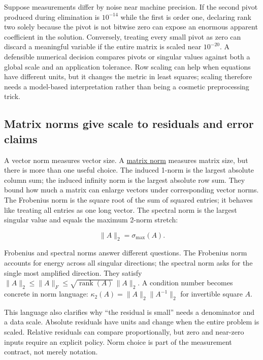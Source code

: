 Suppose measurements differ by noise near machine precision. If the second pivot produced during elimination is \(10^{-14}\) while the first is order one, declaring rank two solely because the pivot is not bitwise zero can expose an enormous apparent coefficient in the solution. Conversely, treating every small pivot as zero can discard a meaningful variable if the entire matrix is scaled near \(10^{-20}\). A defensible numerical decision compares pivots or singular values against both a global scale and an application tolerance. Row scaling can help when equations have different units, but it changes the metric in least squares; scaling therefore needs a model-based interpretation rather than being a cosmetic preprocessing trick.

\subsection{Matrix norms give scale to residuals and error claims}\label{matrix-norms-give-scale-to-residuals-and-error-claims}

A vector norm measures vector size. A \hyperref[01-foundations-i-ch019]{matrix norm} measures matrix size, but there is more than one useful choice. The induced 1-norm is the largest absolute column sum; the induced infinity norm is the largest absolute row sum. They bound how much a matrix can enlarge vectors under corresponding vector norms. The Frobenius norm is the square root of the sum of squared entries; it behaves like treating all entries as one long vector. The spectral norm is the largest singular value and equals the maximum 2-norm stretch:

\[
\|A\|_2=\sigma_{\max}(A).
\]

Frobenius and spectral norms answer different questions. The Frobenius norm accounts for energy across all singular directions; the spectral norm asks for the single most amplified direction. They satisfy \(\|A\|_2\le\|A\|_F\le\sqrt{\operatorname{rank}(A)}\,\|A\|_2\). A condition number becomes concrete in norm language: \(\kappa_2(A)=\|A\|_2\|A^{-1}\|_2\) for invertible square \(A\).

This language also clarifies why ``the residual is small'' needs a denominator and a data scale. Absolute residuals have units and change when the entire problem is scaled. Relative residuals can compare proportionally, but zero and near-zero inputs require an explicit policy. Norm choice is part of the measurement contract, not merely notation.

